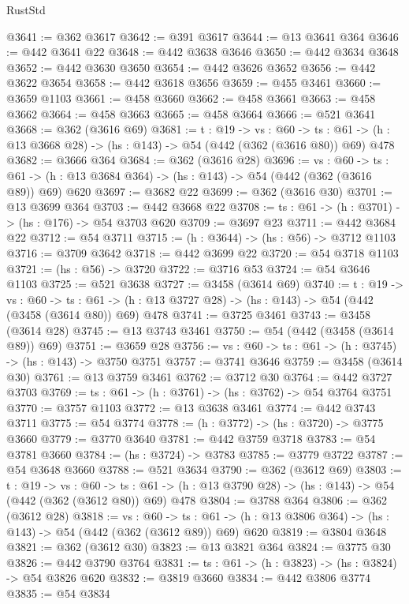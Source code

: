 \begin{lexlean}{RustStd}
\begin{coremodule}
@3641 := @362 @3617
@3642 := @391 @3617
@3644 := @13 @3641 @364
@3646 := @442 @3641 @22
@3648 := @442 @3638 @3646
@3650 := @442 @3634 @3648
@3652 := @442 @3630 @3650
@3654 := @442 @3626 @3652
@3656 := @442 @3622 @3654
@3658 := @442 @3618 @3656
@3659 := @455 @3461
@3660 := @3659 @1103
@3661 := @458 @3660
@3662 := @458 @3661
@3663 := @458 @3662
@3664 := @458 @3663
@3665 := @458 @3664
@3666 := @521 @3641
@3668 := @362 (@3616 @69)
@3681 := {t : @19} ->
  {vs : @60} ->
  {ts : @61} -> (h : @13 @3668 @28) -> (hs : @143) -> @54 (@442 (@362 (@3616 @80)) @69) @478
@3682 := @3666 @364
@3684 := @362 (@3616 @28)
@3696 := {vs : @60} ->
  {ts : @61} -> (h : @13 @3684 @364) -> (hs : @143) -> @54 (@442 (@362 (@3616 @89)) @69) @620
@3697 := @3682 @22
@3699 := @362 (@3616 @30)
@3701 := @13 @3699 @364
@3703 := @442 @3668 @22
@3708 := {ts : @61} -> (h : @3701) -> (hs : @176) -> @54 @3703 @620
@3709 := @3697 @23
@3711 := @442 @3684 @22
@3712 := @54 @3711
@3715 := (h : @3644) -> (hs : @56) -> @3712 @1103
@3716 := @3709 @3642
@3718 := @442 @3699 @22
@3720 := @54 @3718 @1103
@3721 := (hs : @56) -> @3720
@3722 := @3716 @53
@3724 := @54 @3646 @1103
@3725 := @521 @3638
@3727 := @3458 (@3614 @69)
@3740 := {t : @19} ->
  {vs : @60} ->
  {ts : @61} -> (h : @13 @3727 @28) -> (hs : @143) -> @54 (@442 (@3458 (@3614 @80)) @69) @478
@3741 := @3725 @3461
@3743 := @3458 (@3614 @28)
@3745 := @13 @3743 @3461
@3750 := @54 (@442 (@3458 (@3614 @89)) @69)
@3751 := @3659 @28
@3756 := {vs : @60} -> {ts : @61} -> (h : @3745) -> (hs : @143) -> @3750 @3751
@3757 := @3741 @3646
@3759 := @3458 (@3614 @30)
@3761 := @13 @3759 @3461
@3762 := @3712 @30
@3764 := @442 @3727 @3703
@3769 := {ts : @61} -> (h : @3761) -> (hs : @3762) -> @54 @3764 @3751
@3770 := @3757 @1103
@3772 := @13 @3638 @3461
@3774 := @442 @3743 @3711
@3775 := @54 @3774
@3778 := (h : @3772) -> (hs : @3720) -> @3775 @3660
@3779 := @3770 @3640
@3781 := @442 @3759 @3718
@3783 := @54 @3781 @3660
@3784 := (hs : @3724) -> @3783
@3785 := @3779 @3722
@3787 := @54 @3648 @3660
@3788 := @521 @3634
@3790 := @362 (@3612 @69)
@3803 := {t : @19} ->
  {vs : @60} ->
  {ts : @61} -> (h : @13 @3790 @28) -> (hs : @143) -> @54 (@442 (@362 (@3612 @80)) @69) @478
@3804 := @3788 @364
@3806 := @362 (@3612 @28)
@3818 := {vs : @60} ->
  {ts : @61} -> (h : @13 @3806 @364) -> (hs : @143) -> @54 (@442 (@362 (@3612 @89)) @69) @620
@3819 := @3804 @3648
@3821 := @362 (@3612 @30)
@3823 := @13 @3821 @364
@3824 := @3775 @30
@3826 := @442 @3790 @3764
@3831 := {ts : @61} -> (h : @3823) -> (hs : @3824) -> @54 @3826 @620
@3832 := @3819 @3660
@3834 := @442 @3806 @3774
@3835 := @54 @3834

\end{coremodule}
\end{lexlean}

